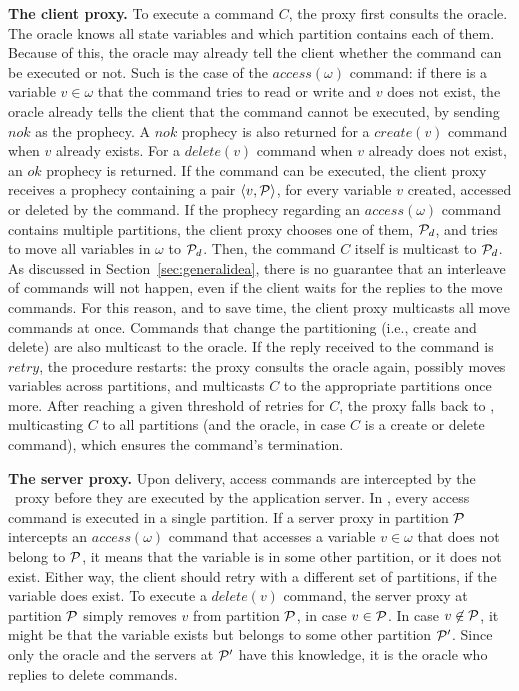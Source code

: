 

\textbf{The client proxy.} To execute a command $C$, the proxy first consults the oracle.
The oracle knows all state variables and which partition contains each of them.
Because of this, the oracle may already tell the client whether the command can be executed or not.
Such is the case of the $access(\omega)$ command: if there is a variable $v \in \omega$ that the command tries to read or write and $v$ does not exist, the oracle already tells the client that the command cannot be executed, by sending $nok$ as the prophecy.
A $nok$ prophecy is also returned for a $create(v)$ command when $v$ already exists.
For a $delete(v)$ command when $v$ already does not exist, an $ok$ prophecy is returned.
If the command can be executed, the client proxy receives a prophecy containing a pair $\langle v, \mathcal{P} \rangle$, for every variable $v$ created, accessed or deleted by the command.
If the prophecy regarding an $access(\omega)$ command contains multiple partitions, the client proxy chooses one of them, $\mathcal{P}_d$, and tries to move all variables in $\omega$ to $\mathcal{P}_d$.
Then, the command $C$ itself is multicast to $\mathcal{P}_d$.
As discussed in Section~\ref{sec:generalidea}, there is no guarantee that an interleave of commands will not happen, even if the client waits for the replies to the move commands.
For this reason, and to save time, the client proxy multicasts all move commands at once.
Commands that change the partitioning (i.e., create and delete) are also multicast to the oracle.
If the reply received to the command is $retry$, the procedure restarts: the proxy consults the oracle again, possibly moves variables across partitions, and multicasts $C$ to the appropriate partitions once more.
After reaching a given threshold of retries for $C$, the proxy falls back to \ssmr{}, multicasting $C$ to all partitions (and the oracle, in case $C$ is a create or delete command), which ensures the command's termination.



\textbf{The server proxy.} Upon delivery, access commands are intercepted by the \dssmr\ proxy before they are executed by the application server.
In \dssmr{}, every access command is executed in a single partition.
If a server proxy in partition $\mathcal{P}$ intercepts an $access(\omega)$ command that accesses a variable $v \in \omega$ that does not belong to $\mathcal{P}$, it means that the variable is in some other partition, or it does not exist.
Either way, the client should retry with a different set of partitions, if the variable does exist.
To execute a $delete(v)$ command, the server proxy at partition $\mathcal{P}$ simply removes $v$ from partition $\mathcal{P}$, in case $v \in \mathcal{P}$.
In case $v \not\in \mathcal{P}$, it might be that the variable exists but belongs to some other partition $\mathcal{P}'$.
Since only the oracle and the servers at $\mathcal{P}'$ have this knowledge, it is the oracle who replies to delete commands.

